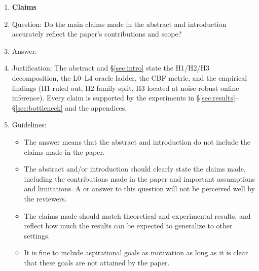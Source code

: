 \documentclass[11pt]{article}
\begin{document}
\begin{enumerate}

\item {\bf Claims}
    \item[] Question: Do the main claims made in the abstract and introduction accurately reflect the paper's contributions and scope?
    \item[] Answer: \answerYes{}
    \item[] Justification: The abstract and \S\ref{sec:intro} state the H1/H2/H3 decomposition, the L0--L4 oracle ladder, the CBF metric, and the empirical findings (H1 ruled out, H2 family-split, H3 located at noise-robust online inference). Every claim is supported by the experiments in \S\ref{sec:results}--\S\ref{sec:bottleneck} and the appendices.
    \item[] Guidelines:
    \begin{itemize}
        \item The answer \answerNA{} means that the abstract and introduction do not include the claims made in the paper.
        \item The abstract and/or introduction should clearly state the claims made, including the contributions made in the paper and important assumptions and limitations. A \answerNo{} or \answerNA{} answer to this question will not be perceived well by the reviewers.
        \item The claims made should match theoretical and experimental results, and reflect how much the results can be expected to generalize to other settings.
        \item It is fine to include aspirational goals as motivation as long as it is clear that these goals are not attained by the paper.
    \end{itemize}


\end{enumerate}
\end{document}
